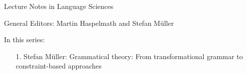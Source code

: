 
{\large Lecture Notes in Language Sciences}

\bigskip

General Editors: Martin Haspelmath and Stefan Müller

\bigskip

In this series:

\begin{enumerate}
\item[1.]\setcounter{enumi}{0} Stefan Müller: Grammatical theory: From transformational grammar to
  constraint-based approaches
\end{enumerate}